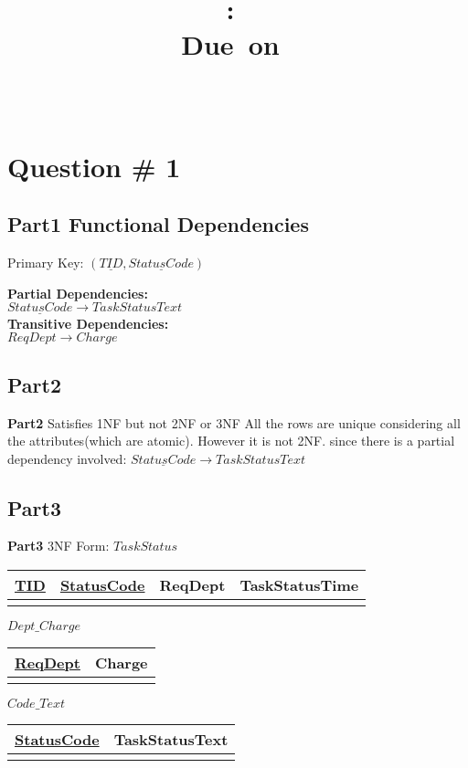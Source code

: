 \documentclass[a4paper,11pt,x11names]{article}
\title{
\vspace{2in}
\textmd{\textbf{\hmwkClass:\ \hmwkTitle}}\\
\normalsize\vspace{0.1in}\small{Due\ on\ \hmwkDueDate}\\
\vspace{3in}
}
\author{\textbf{\hmwkAuthorName} \\
	\textbf{\hmwkAuthorID}
	}
\date{} %
\begin{document}
\maketitle
\clearpage
\section{Question \# 1} %
    \subsection{Part1 Functional Dependencies}
    Primary Key: $(\underline{TID},\underline{StatusCode})$ 
    
   
    \textbf{Partial Dependencies:} \\
    $\underline{StatusCode} \longrightarrow TaskStatusText$\\

    \textbf{Transitive Dependencies:} \\
    $ReqDept \longrightarrow Charge$
    
    \subsection{Part2}
    \textbf{Part2} Satisfies 1NF but not 2NF or 3NF
    All the rows are unique considering all the attributes(which are atomic). However  it is not 2NF. since there is a partial dependency involved: 
    $\underline{StatusCode} \longrightarrow TaskStatusText$\\

    \subsection{Part3}
    \textbf{Part3} 3NF Form:	\newline
    $TaskStatus$
	\begin{tabular}{|c|c|c|c|}
	\hline \underline{TID} & \underline{StatusCode}  & ReqDept  & TaskStatusTime  \\ 
	\hline  &  &  &  \\ 
	\hline 
	\end{tabular} 
	\newline
	$Dept\_Charge$
	\begin{tabular}{|c|c|}
		\hline \underline{ReqDept}  & Charge   \\ 
		\hline  &    \\ 
		\hline 
	\end{tabular} 
	\newline	
	$Code\_Text$
	\begin{tabular}{|c|c|}
		\hline \underline{StatusCode}  & TaskStatusText   \\ 
		\hline  &    \\ 
		\hline 
	\end{tabular} 
\end{document}
